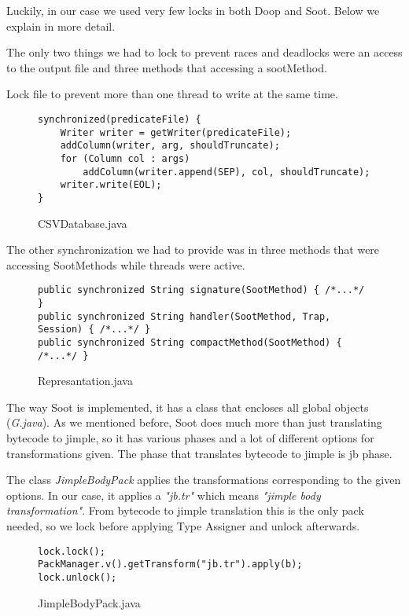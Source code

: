 \documentclass{dithesis}
\begin{document}
	Luckily, in our case we used very few locks in both Doop and Soot. Below we explain in more detail.
    
    	The only two things we had to lock to prevent races and deadlocks were an access to the output file and three methods that accessing a sootMethod.
    	
	    	Lock file to prevent more than one thread to write at the same time. 
	    	\begin{figure}[H]
\begin{lstlisting}
synchronized(predicateFile) {
    Writer writer = getWriter(predicateFile);
    addColumn(writer, arg, shouldTruncate);
    for (Column col : args)
        addColumn(writer.append(SEP), col, shouldTruncate);
    writer.write(EOL);
}
\end{lstlisting}
	        \caption{CSVDatabase.java}
	        \end{figure}

	    	The other synchronization we had to provide was in three methods that were accessing SootMethods while threads were active.
	    	\begin{figure}[H]
\begin{lstlisting}
public synchronized String signature(SootMethod) { /*...*/ }
public synchronized String handler(SootMethod, Trap, Session) { /*...*/ }
public synchronized String compactMethod(SootMethod) { /*...*/ }
\end{lstlisting}
	        \caption{Represantation.java}
	        \end{figure}


	    The way Soot is implemented, it has a class that encloses all global objects (\textit{G.java}). As we mentioned before, Soot does much more than just translating bytecode to jimple, so it has various phases and a lot of different options for transformations given. The phase that translates bytecode to jimple is jb phase.

	    	The class \textit{JimpleBodyPack} applies the transformations corresponding to the given options. In our case, it applies a \textit{"jb.tr"} which means \textit{"jimple body transformation"}. From bytecode to jimple translation this is the only pack needed, so we lock before applying Type Assigner and unlock afterwards.
	    	\begin{figure}[H]
\begin{lstlisting}
lock.lock();
PackManager.v().getTransform("jb.tr").apply(b);
lock.unlock();
\end{lstlisting}
	        \caption{JimpleBodyPack.java}
	        \end{figure}
\end{document}
